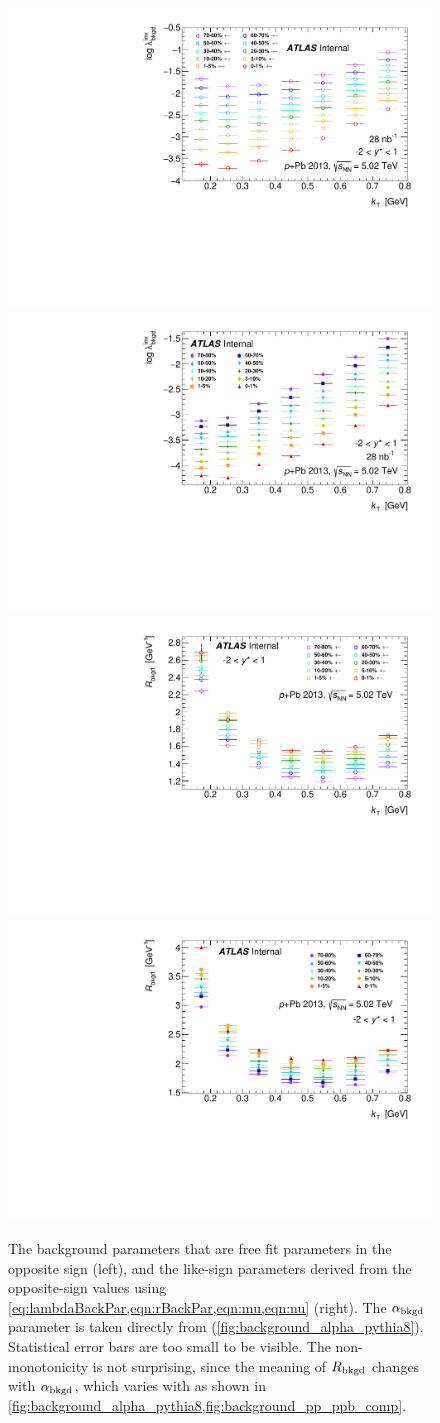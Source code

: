 \begin{figure}[t]
\begin{minipage}[t]{1.0\textwidth}
\centering
\includegraphics[width=.49\linewidth]{canqinv_backLambda_vs_kt_opp.pdf}
\includegraphics[width=.49\linewidth]{canqinv_backLambda_vs_kt_same.pdf}\\
\includegraphics[width=.49\linewidth]{canqinv_backR_vs_kt_opp.pdf}
\includegraphics[width=.49\linewidth]{canqinv_backR_vs_kt_same.pdf}\\
\end{minipage}
\caption{The background parameters that are free fit parameters in the opposite sign (left), and the like-sign parameters derived from the opposite-sign values using \cref{eq:lambdaBackPar,eqn:rBackPar,eqn:mu,eqn:nu} (right). The $\alpha_{\mathrm{bkgd}}$ parameter is taken directly from \PYEight (\cref{fig:background_alpha_pythia8}). Statistical error bars are too small to be visible. The non-monotonicity is not surprising, since the meaning of $R_{\mathrm{bkgd}}$ changes with $\alpha_{\mathrm{bkgd}}$, which varies with \kt as shown in \cref{fig:background_alpha_pythia8,fig:background_pp_ppb_comp}.}
\label{fig:background_data}
\end{figure}


